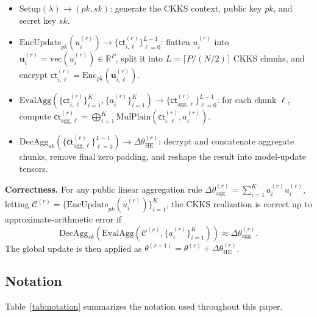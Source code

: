 \documentclass[journal]{IEEEtran}
\begin{document}
\begin{itemize}
    \item $\mathrm{Setup}(\lambda)\rightarrow(pk,sk)$:
    generate the CKKS context, public key $pk$, and secret key $sk$.

    \item $\mathrm{EncUpdate}_{pk}(u_i^{(r)})\rightarrow
    \{\mathsf{ct}_{i,\ell}^{(r)}\}_{\ell=0}^{L-1}$:
    flatten $u_i^{(r)}$ into
    $\mathbf{u}_i^{(r)}=\mathrm{vec}(u_i^{(r)})\in\mathbb{R}^{P}$, split it
    into $L=\lceil P/(N/2)\rceil$ CKKS chunks, and encrypt
    $\mathsf{ct}_{i,\ell}^{(r)}=\mathrm{Enc}_{pk}(\mathbf{u}_{i,\ell}^{(r)})$.

    \item $\mathrm{EvalAgg}(\{\mathsf{ct}_{i,\ell}^{(r)}\}_{i=1}^{K},
    \{a_i^{(r)}\}_{i=1}^{K})\rightarrow
    \{\mathsf{ct}_{\mathrm{agg},\ell}^{(r)}\}_{\ell=0}^{L-1}$:
    for each chunk $\ell$, compute
    $\mathsf{ct}_{\mathrm{agg},\ell}^{(r)}
    =\bigoplus_{i=1}^{K}\mathrm{MulPlain}
    (\mathsf{ct}_{i,\ell}^{(r)},a_i^{(r)})$.

    \item $\mathrm{DecAgg}_{sk}(\{\mathsf{ct}_{\mathrm{agg},\ell}^{(r)}\}_{\ell=0}^{L-1})
    \rightarrow \Delta\theta_{\mathrm{HE}}^{(r)}$:
    decrypt and concatenate aggregate chunks, remove final zero padding, and
    reshape the result into model-update tensors.
\end{itemize}

\noindent\textbf{Correctness.}
For any public linear aggregation rule
$\Delta\theta_{\mathrm{agg}}^{(r)}=\sum_{i=1}^{K}a_i^{(r)}u_i^{(r)}$,
letting
$\mathcal{C}^{(r)}=\{\mathrm{EncUpdate}_{pk}(u_i^{(r)})\}_{i=1}^{K}$,
the CKKS realization is correct up to approximate-arithmetic error if
\[
\mathrm{DecAgg}_{sk}\!\left(
\mathrm{EvalAgg}\!\left(
\mathcal{C}^{(r)},
\{a_i^{(r)}\}_{i=1}^{K}
\right)
\right)
\approx
\Delta\theta_{\mathrm{agg}}^{(r)}.
\]
The global update is then applied as
$\theta^{(r+1)}=\theta^{(r)}+\Delta\theta_{\mathrm{HE}}^{(r)}$.

\Needspace{0.92\textheight}
\subsection{Notation}
Table~\ref{tab:notation} summarizes the notation used throughout this paper.
\end{document}
